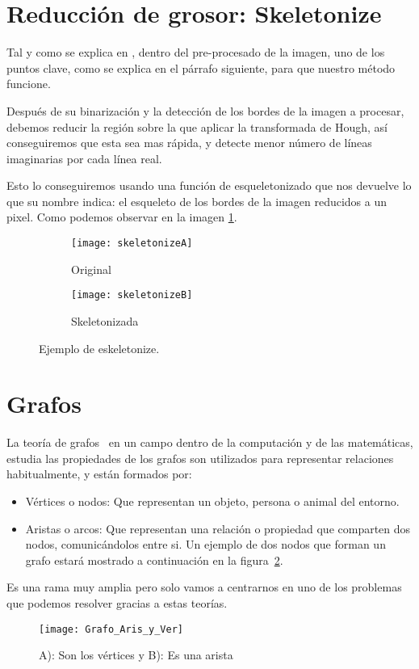 \section{Reducción de grosor: Skeletonize}
Tal y como se explica en \cite{scik:skeleton}, dentro del pre-procesado de la imagen, uno de los puntos clave, como se explica en el párrafo siguiente, para que nuestro método funcione.

Después de su binarización y la detección de los bordes de la imagen a procesar, debemos reducir la región sobre la que aplicar la transformada de Hough, así conseguiremos que esta sea mas rápida, y detecte menor número de líneas imaginarias por cada línea real.

Esto lo conseguiremos usando una función de esqueletonizado que nos devuelve lo que su nombre indica: el esqueleto de los bordes de la imagen reducidos a un pixel. Como podemos observar en la imagen \ref{fig:3.6}.


\begin{figure}
\begin{subfigure}[b]{.5\linewidth}
\centering\large \texttt{[image: skeletonizeA]}
\caption{Original}
\end{subfigure}%
\begin{subfigure}[b]{.5\linewidth}
\centering\large \texttt{[image: skeletonizeB]}
\caption{Skeletonizada}
\end{subfigure}
\caption{Ejemplo de eskeletonize.}\label{fig:3.6}
\end{figure}


\section{Grafos}	
La teoría de grafos~\cite{Wiki:Grafos} en un campo dentro de la computación y de las matemáticas, estudia las propiedades de los grafos son utilizados para representar relaciones habitualmente, y están formados por:
\begin{itemize}
	\item Vértices o nodos: Que representan un objeto, persona o animal del entorno.
	\item Aristas o arcos: Que representan una relación o propiedad que comparten dos nodos, comunicándolos entre si.
Un ejemplo de dos nodos que forman un grafo estará mostrado a continuación en la figura~\ref{fig:3.7}.
\end{itemize}

Es una rama muy amplia pero solo vamos a centrarnos en uno de los problemas que podemos resolver gracias a estas teorías.
\begin{figure}[h]
\centering
\texttt{[image: Grafo\_Aris\_y\_Ver]}
\caption{A): Son los vértices y B): Es una arista}
\label{fig:3.7}
\end{figure}

